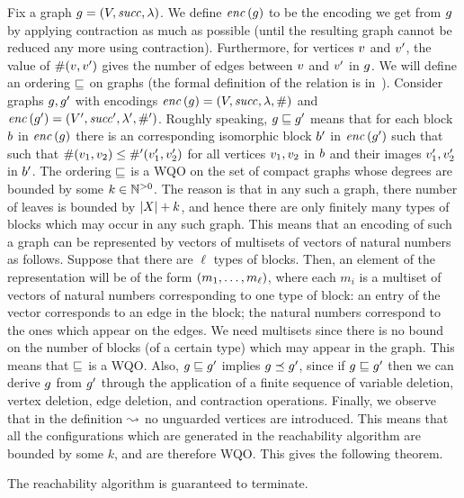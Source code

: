 Fix a graph $g=\left(V,{\it succ},\lambda\right)$.
%
We define ${\it enc}\left(g\right)$ to be the encoding we get from $g$ 
by applying contraction as much as possible (until the resulting
graph cannot be reduced any more using contraction).
%
Furthermore, for vertices $v$ and $v'$, the value
of $\#(v,v')$ gives the number of edges between $v$ and $v'$
in $g$.
%
We will define an ordering $\sqsubseteq$ on graphs 
(the formal definition of the relation is in~\cite{it:2008-015}). %
%
Consider graphs $g,g'$ with encodings 
${\it enc}\left(g\right)=\left(V,{\it succ},\lambda,\#\right)$
and ${\it enc}\left(g'\right)=\left(V',{\it succ}',\lambda',\#'\right)$.
%
Roughly speaking,  $g\sqsubseteq g'$ means that for each
block $b$ in ${\it enc}\left(g\right)$ there is an corresponding
isomorphic block $b'$ in ${\it enc}\left(g'\right)$ such that
such that $\#(v_1,v_2)\leq\#'(v'_1,v'_2)$ %
for all vertices $v_1,v_2$ in $b$ and their images $v'_1,v'_2$
in $b'$.
%
The ordering  $\sqsubseteq$ is a WQO on the set of compact graphs whose degrees are bounded by some
$k\in{\mathbb N}^{>0}$.
%
The reason is that in any such a graph, there number of leaves is bounded by
$|X|+k$, and hence there are only finitely many types of blocks which may
occur in any such graph.
%
This means that an encoding of such a graph can be represented by vectors of multisets of vectors of natural numbers
as follows.
%
Suppose that there are $\ell$ types of blocks.
%
Then, an element of the representation will be of the form $\left(m_1,\ldots,m_\ell\right)$,
where each $m_i$ is a multiset of vectors of natural numbers corresponding to one type of block:
an entry of the vector corresponds to an edge in the block; the natural numbers correspond to
the ones which appear on the edges.  
%
We need multisets since there is no bound on the number
of blocks (of a certain type) which may appear in the graph.
%
This means that $\sqsubseteq$ is a WQO.
%
Also, $g\sqsubseteq g'$ implies $g\preceq g'$,
since  if $g\sqsubseteq g'$ then we can derive $g$ from $g'$
through the application of a finite sequence of variable deletion, vertex deletion, 
edge deletion, and contraction operations.
%
Finally, we observe that in the definition $\stackrel{}{\leadsto}$ no unguarded vertices are introduced.
%
This means that all the configurations which are generated in the reachability algorithm are bounded
by some $k$, and are therefore WQO.
%
This gives the following theorem.
%
\begin{theorem}
\label{termination:theorem}
The reachability algorithm is guaranteed to terminate.
\end{theorem}






%
